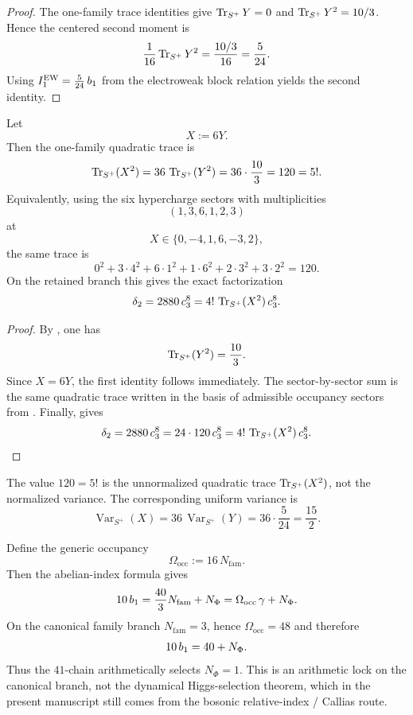 \begin{proof}
The one-family trace identities give $\operatorname{Tr}_{S^+}Y=0$ and $\operatorname{Tr}_{S^+}Y^2=10/3$. Hence the centered second moment is
\[
\frac{1}{16}\operatorname{Tr}_{S^+}Y^2=\frac{10/3}{16}=\frac{5}{24}.
\]
Using $I_1^{\mathrm{EW}}=\frac{5}{24}\,b_1$ from the electroweak block relation yields the second identity.
\end{proof}

\begin{corollary}
\label{cor:factorial-trace-delta2}
Let
\[
X:=6Y.
\]
Then the one-family quadratic trace is
\[
\operatorname{Tr}_{S^+}(X^2)
=
36\,\operatorname{Tr}_{S^+}(Y^2)
=
36\cdot\frac{10}{3}
=
120
=
5!.
\]
Equivalently, using the six hypercharge sectors with multiplicities
\[
(1,3,6,1,2,3)
\]
at
\[
X\in\{0,-4,1,6,-3,2\},
\]
the same trace is
\[
0^2+3\cdot 4^2+6\cdot 1^2+1\cdot 6^2+2\cdot 3^2+3\cdot 2^2=120.
\]
On the retained branch this gives the exact factorization
\[
\delta_2
=
2880\,c_3^8
=
4!\,\operatorname{Tr}_{S^+}(X^2)\,c_3^8.
\]
\end{corollary}

\begin{proof}
By , one has
\[
\operatorname{Tr}_{S^+}(Y^2)=\frac{10}{3}.
\]
Since $X=6Y$, the first identity follows immediately. The sector-by-sector sum is the same quadratic trace written in the basis of admissible occupancy sectors from . Finally,  gives
\[
\delta_2=2880\,c_3^8=24\cdot 120\,c_3^8
=
4!\,\operatorname{Tr}_{S^+}(X^2)\,c_3^8.
\]
\end{proof}

\begin{remark}
The value $120=5!$ is the unnormalized quadratic trace $\operatorname{Tr}_{S^+}(X^2)$, not the normalized variance. The corresponding uniform variance is
\[
\operatorname{Var}_{S^+}(X)=36\,\operatorname{Var}_{S^+}(Y)=36\cdot\frac{5}{24}=\frac{15}{2}.
\]
\end{remark}

\begin{remark}
Define the generic occupancy
\[
\Omega_{\mathrm{occ}}:=16\,N_{\mathrm{fam}}.
\]
Then the abelian-index formula gives
\[
10\,b_1
=
\frac{40}{3}N_{\mathrm{fam}}+N_\Phi
=
\Omega_{\mathrm{occ}}\,\gamma+N_\Phi.
\]
On the canonical family branch $N_{\mathrm{fam}}=3$, hence $\Omega_{\mathrm{occ}}=48$ and therefore
\[
10\,b_1=40+N_\Phi.
\]
Thus the $41$-chain arithmetically selects $N_\Phi=1$. This is an arithmetic lock on the canonical branch, not the dynamical Higgs-selection theorem, which in the present manuscript still comes from the bosonic relative-index / Callias route.
\end{remark}

